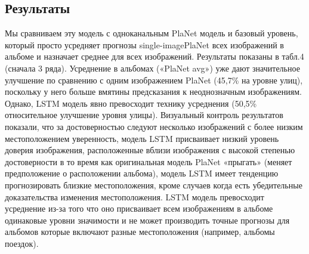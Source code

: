 \subsection{Результаты} Мы сравниваем эту модель с одноканальным PlaNet
модель и базовый уровень, который просто усредняет прогнозы single-imagePlaNet всех изображений в альбоме и назначает
среднее для всех изображений. Результаты показаны в табл.4 (сначала
3 ряда). Усреднение в альбомах («PlaNet avg») уже
дают значительное улучшение по сравнению с одним изображением PlaNet
(45,7\% на уровне улиц), поскольку у него больше
вмятины предсказания к неоднозначным изображениям. Однако, LSTM
модель явно превосходит технику усреднения (50,5\%
относительное улучшение уровня улицы). Визуальный контроль
результатов показали, что за достоверностью следуют несколько изображений с более низким местоположением уверенность, модель LSTM присваивает низкий уровень доверия изображения, расположенные вблизи изображения с высокой степенью достоверности в то время как оригинальная модель PlaNet «прыгать» (меняет предположение о расположении альбома), модель LSTM имеет тенденцию прогнозировать близкие местоположения, кроме случаев когда
есть убедительные доказательства изменения местоположения. LSTM
модель превосходит усреднение из-за того что оно присваивает всем изображениям в альбоме одинаковые уровни значимости и не может производить точные прогнозы для альбомов которые включают разные местоположения (например, альбомы поездок).

